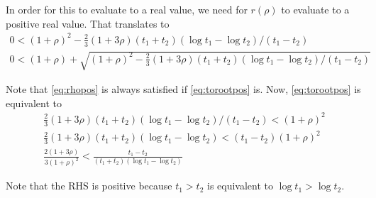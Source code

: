 \documentclass{amsart}
\begin{document}
In order for this to evaluate to a real value, we need for $r(\rho)$ to evaluate to a positive real value.
That translates to
\begin{gather}
  0 < (1+\rho)^2 - \frac{2}{3} (1+3 \rho)(t_1 + t_2) (\log t_1 - \log t_2) / (t_1 - t_2) \label{eq:torootpos} \\
  0 < (1+\rho) + \sqrt{(1+\rho)^2 - \frac{2}{3} (1+3 \rho)(t_1 + t_2) (\log t_1 - \log t_2) / (t_1 - t_2)} \label{eq:rhopos}
\end{gather}

Note that \eqref{eq:rhopos} is always satisfied if \eqref{eq:torootpos} is.
Now, \eqref{eq:torootpos} is equivalent to
\begin{gather}
  \frac{2}{3} (1+3 \rho)(t_1 + t_2) (\log t_1 - \log t_2) / (t_1 - t_2) < (1+\rho)^2 \\
  \frac{2}{3} (1+3 \rho)(t_1 + t_2) (\log t_1 - \log t_2) < (t_1 - t_2) (1+\rho)^2 \\
  \frac{2 (1+3 \rho)}{3 (1+\rho)^2} < \frac{t_1 - t_2}{(t_1 + t_2) (\log t_1 - \log t_2)}
\end{gather}

Note that the RHS is positive because $t_1 > t_2$ is equivalent to $\log t_1 > \log t_2$.
\end{document}
